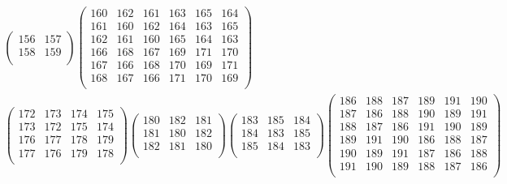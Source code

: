 \documentclass[10pt,a4paper,landscape]{amsart}
\begin{document}
\begin{align*}
\left(\begin{array}{r|r}%
156&157\\\hline%
158&159\\%
\end{array}\right)%
\left(\begin{array}{rrr|rrr}%
160&162&161&163&165&164\\%
161&160&162&164&163&165\\%
162&161&160&165&164&163\\\hline%
166&168&167&169&171&170\\%
167&166&168&170&169&171\\%
168&167&166&171&170&169\\%
\end{array}\right)%
\\
\left(\begin{array}{rr|rr}%
172&173&174&175\\%
173&172&175&174\\\hline%
176&177&178&179\\%
177&176&179&178\\%
\end{array}\right)%
\left(\begin{array}{rrr}%
180&182&181\\%
181&180&182\\%
182&181&180\\%
\end{array}\right)%
\left(\begin{array}{rrr}%
183&185&184\\%
184&183&185\\%
185&184&183\\%
\end{array}\right)%
\left(\begin{array}{rrrrrr}%
186&188&187&189&191&190\\%
187&186&188&190&189&191\\%
188&187&186&191&190&189\\%
189&191&190&186&188&187\\%
190&189&191&187&186&188\\%
191&190&189&188&187&186\\%
\end{array}\right)%
\end{align*}
\end{document}
